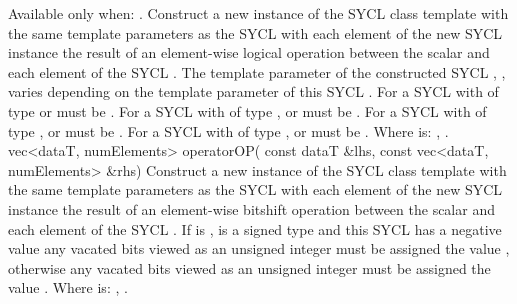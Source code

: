   {
    Available only when: .
    \newline
    Construct a new instance of the SYCL  class template with
    the same template parameters as the  SYCL 
    with each element of the new SYCL  instance the result of
    an element-wise  logical operation between the  scalar and each element of the  SYCL .
    \newline \newline
    The  template parameter of the constructed SYCL , , varies depending on the  template parameter of this SYCL . For a SYCL  with  of type  or   must be . For a SYCL  with  of type ,  or   must be . For a SYCL  with  of type ,  or   must be . For a SYCL  with  of type ,  or   must be .
    \newline \newline
    Where  is: \codeinline{\&\&}, \codeinline{||}.
  }
  \addRowThreeL
  { vec<dataT, numElements> operatorOP( }
  { const dataT \&lhs, }
  { const vec<dataT, numElements> \&rhs) }
  {
    Construct a new instance of the SYCL  class template with
    the same template parameters as the  SYCL 
    with each element of the new SYCL  instance the result of
    an element-wise  bitshift operation between the  scalar and each element of the  SYCL .
    If  is \codeinline{>>},  is a signed type
    and this SYCL  has a negative value any vacated bits viewed
    as an unsigned integer must be assigned the value , otherwise
    any vacated bits viewed as an unsigned integer must be assigned the value
    .
    \newline \newline
    Where  is: \codeinline{<<}, \codeinline{>>}.
  }
